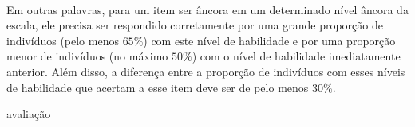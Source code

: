 	\paragraph{}
	    Em outras palavras, para um item ser âncora em um determinado nível âncora da escala, ele precisa ser respondido corretamente por uma grande 	proporção de indivíduos (pelo menos $65\%$) com este nível de habilidade e por uma proporção menor de indivíduos (no máximo $50\%$) com o nível de habilidade imediatamente anterior. Além disso, a diferença entre a proporção de indivíduos com esses níveis de habilidade que acertam a esse item deve ser de pelo menos $30\%$.
	
	avaliação\cite{Francisco}
	\newpage